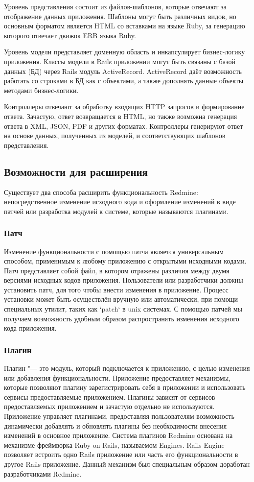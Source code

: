Уровень представления состоит из файлов-шаблонов, которые отвечают за
отображение данных приложения. Шаблоны могут быть различных видов, но основным
форматом является HTML со вставками на языке Ruby, за генерацию которого
отвечает движок ERB языка Ruby.

Уровень модели представляет доменную область и инкапсулирует бизнес-логику
приложения. Классы модели в Rails приложении могут быть связаны с базой данных
(БД) через Rails модуль ActiveRecord. ActiveRecord даёт возможность работать со
строками в БД как с объектами, а также дополнять данные объекты методами
бизнес-логики.

Контроллеры отвечают за обработку входящих HTTP запросов и формирование ответа.
Зачастую, ответ возвращается в HTML, но также возможна генерация ответа в XML,
JSON, PDF и других форматах. Контроллеры генерируют ответ на основе данных,
полученных из моделей, и соответствующих шаблонов представления.

\subsection{Возможности для расширения}
Существует два способа расширить функциональность Redmine: непосредственное
изменение исходного кода и оформление изменений в виде патчей или разработка 
модулей к системе, которые называются плагинами.

\subsubsection{Патч}
Изменение функциональности с помощью патча является универсальным способом,
применимым к любому приложению с открытыми исходными кодами. Патч представляет
собой файл, в котором отражены различия между двумя версиями исходных кодов
приложения. Пользователи или разработчики должны установить патч, для того
чтобы внести изменения в приложение. Процесс установки может быть осуществлён
вручную или автоматически, при помощи специальных утилит, таких как `patch` в
unix системах. С помощью патчей мы получаем возможность удобным образом
распространять изменения исходного кода приложения.

\subsubsection{Плагин}
Плагин "--- это модуль, который подключается к приложению, с целью изменения
или добавления функциональности. Приложение предоставляет механизмы, которые
позволяют плагину зарегистрировать себя в приложении и использовать сервисы
предоставляемые приложением. Плагины зависят от сервисов предоставляемых
приложением и зачастую отдельно не используются. Приложение управляет
плагинами, предоставляя пользователям возможность динамически добавлять и
обновлять плагины без необходимости внесения изменений в основное приложение.
Система плагинов Redmine основана на механизме фреймворка Ruby on Rails,
называемом Engines. Rails Engine позволяет встроить одно Rails приложение или
часть его функциональности в другое Rails приложение. Данный механизм был
специальным образом доработан разработчиками Redmine.

